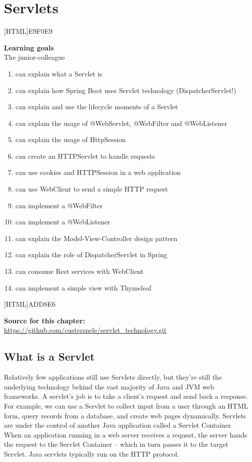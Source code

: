 \chapter{Servlets}

[HTML]{E9F0E9}{\parbox{\textwidth}{%
\noindent \textbf{Learning goals}\\
The junior-colleague
\begin{enumerate}[nolistsep]
\item can explain what a Servlet is
\item can explain how Spring Boot uses Servlet technology (DispatcherServlet!)
\item can explain and use the lifecycle moments of a Servlet
\item can explain the usage of @WebServlet, @WebFilter and @WebListener
\item can explain the usage of HttpSession
\item can create an HTTPServlet to handle requests
\item can use cookies and HTTPSession in a web application
\item can use WebClient to send a simple HTTP request 
\item can implement a @WebFilter
\item can implement a @WebListener
\item can explain the Model-View-Controller design pattern
\item can explain the role of DispatcherServlet in Spring
\item can consume Rest services with WebClient
\item can implement a simple view with Thymeleaf
\end{enumerate}
}}

[HTML]{ADD8E6}{\parbox{\textwidth}{%
\noindent \textbf{Source for this chapter:}\\
\url{https://github.com/custersnele/servlet_technology.git}
}}

\section{What is a Servlet}

Relatively few applications still use Servlets directly,  but they're still the underlying technology behind the vast majority of Java and JVM web frameworks.
A servlet’s job is to take a client’s request and send back a response.
For example, we can use a Servlet to collect input from a user through an HTML form, query records from a database, and create web pages dynamically.
Servlets are under the control of another Java application called a Servlet Container. When an application running in a web server receives a request, the server hands the request to the Servlet Container – which in turn passes it to the target Servlet.
Java servlets typically run on the HTTP protocol. 

